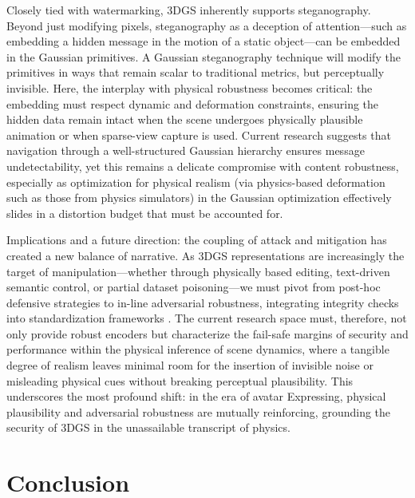 \documentclass[11pt,a4paper]{article}
\begin{document}
Closely tied with watermarking, 3DGS inherently supports steganography. Beyond just modifying pixels, steganography as a deception of attention---such as embedding a hidden message in the motion of a static object---can be embedded in the Gaussian primitives. A Gaussian steganography technique will modify the primitives in ways that remain scalar to traditional metrics, but perceptually invisible. Here, the interplay with physical robustness becomes critical: the embedding must respect dynamic and deformation constraints, ensuring the hidden data remain intact when the scene undergoes physically plausible animation or when sparse-view capture is used. Current research suggests that navigation through a well-structured Gaussian hierarchy \cite{arxiv:2411.12788v2} ensures message undetectability, yet this remains a delicate compromise with content robustness, especially as optimization for physical realism (via physics-based deformation such as those from physics simulators) in the Gaussian optimization effectively slides in a distortion budget that must be accounted for.

Implications and a future direction: the coupling of attack and mitigation has created a new balance of narrative. As 3DGS representations are increasingly the target of manipulation---whether through physically based editing, text-driven semantic control, or partial dataset poisoning---we must pivot from post-hoc defensive strategies to in-line adversarial robustness, integrating integrity checks into standardization frameworks \cite{arxiv:2402.06149v1}. The current research space must, therefore, not only provide robust encoders but characterize the fail-safe margins of security and performance within the physical inference of scene dynamics, where a tangible degree of realism leaves minimal room for the insertion of invisible noise or misleading physical cues without breaking perceptual plausibility. This underscores the most profound shift: in the era of avatar Expressing, physical plausibility and adversarial robustness are mutually reinforcing, grounding the security of 3DGS in the unassailable transcript of physics.


\section{Conclusion}
\end{document}
